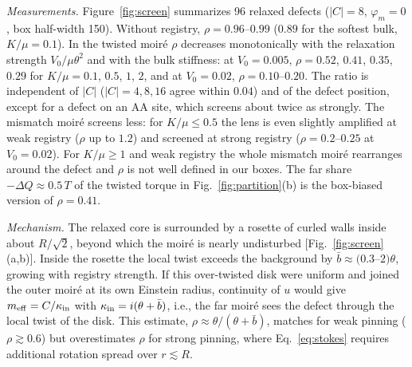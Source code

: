 \documentclass[prb,twocolumn,superscriptaddress,floatfix,10pt]{revtex4-2}
\begin{document}
\emph{Measurements.} Figure~\ref{fig:screen} summarizes 96 relaxed defects ($|C|=8$, $\varphi_m=0$, box half-width 150). Without registry, $\rho=0.96$--$0.99$ ($0.89$ for the softest bulk, $K/\mu=0.1$). In the twisted moir\'e $\rho$ decreases monotonically with the relaxation strength $V_0/\mu\theta^2$ and with the bulk stiffness: at $V_0=0.005$, $\rho=0.52$, $0.41$, $0.35$, $0.29$ for $K/\mu=0.1$, $0.5$, $1$, $2$, and at $V_0=0.02$, $\rho=0.10$--$0.20$. The ratio is independent of $|C|$ ($|C|=4,8,16$ agree within $0.04$) and of the defect position, except for a defect on an AA site, which screens about twice as strongly. The mismatch moir\'e screens less: for $K/\mu\le0.5$ the lens is even slightly amplified at weak registry ($\rho$ up to $1.2$) and screened at strong registry ($\rho=0.2$--$0.25$ at $V_0=0.02$). For $K/\mu\ge1$ and weak registry the whole mismatch moir\'e rearranges around the defect and $\rho$ is not well defined in our boxes. The far share $-\Delta Q\approx0.5\,T$ of the twisted torque in Fig.~\ref{fig:partition}(b) is the box-biased version of $\rho=0.41$.

\emph{Mechanism.} The relaxed core is surrounded by a rosette of curled walls inside about $R/\sqrt2$, beyond which the moir\'e is nearly undisturbed [Fig.~\ref{fig:screen}(a,b)]. Inside the rosette the local twist exceeds the background by $\bar b\approx(0.3$--$2)\theta$, growing with registry strength. If this over-twisted disk were uniform and joined the outer moir\'e at its own Einstein radius, continuity of $u$ would give $m_{\rm eff}=C/\kappa_{\rm in}$ with $\kappa_{\rm in}=i(\theta+\bar b)$, i.e., the far moir\'e sees the defect through the local twist of the disk. This estimate, $\rho\approx\theta/(\theta+\bar b)$, matches for weak pinning ($\rho\gtrsim0.6$) but overestimates $\rho$ for strong pinning, where Eq.~\eqref{eq:stokes} requires additional rotation spread over $r\lesssim R$.
\end{document}
